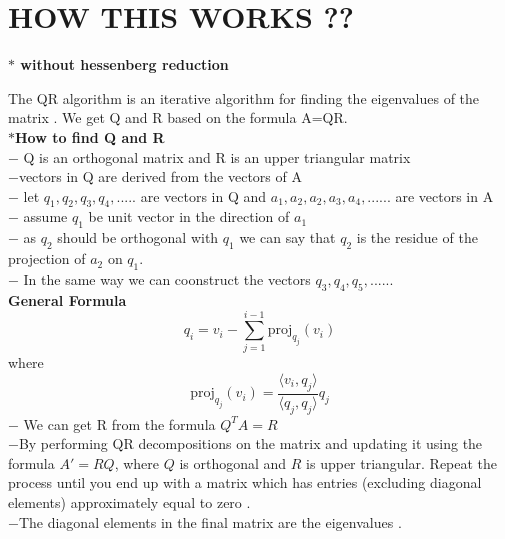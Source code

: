 \documentclass[journal]{IEEEtran}
\begin{document}
\section{\textbf{HOW THIS WORKS ??}}\vspace{0.3cm}
\begin{center}
     \textbf{$*$ without hessenberg reduction}
\end{center}
The QR algorithm is an iterative algorithm for finding the eigenvalues of the matrix . We get Q and R based on the formula A=QR.\vspace{0.3cm}\\
\textbf{$*$How to find Q and R}\vspace{0.3cm}\\
$-$ Q is an orthogonal matrix and R is an upper triangular matrix \vspace{0.3cm}\\
$-$vectors in Q are derived from the vectors of A \vspace{0.3cm}\\
$-$ let   $q_1,q_2,q_3,q_4,.....$   are vectors in Q and $a_1,a_2,a_2,a_3,a_4,......$  are vectors in A\vspace{0.3cm}\\
$-$ assume $q_1$ be unit vector in the direction of $a_1$\vspace{0.3cm}\\
$-$ as $q_2$ should be orthogonal with $q_1$ we can say that $q_2$ is the residue of the projection of $a_2$ on $q_1$.\vspace{0.3cm}\\
$-$ In the same way we can coonstruct the vectors $q_3,q_4,q_5,......$ \vspace{0.3cm}\\
\textbf{General Formula}\\
\[
q_i = v_i - \sum_{j=1}^{i-1} \text{proj}_{q_j}(v_i)
\]
where
\[
\text{proj}_{q_j}(v_i) = \frac{\langle v_i, q_j \rangle}{\langle q_j, q_j \rangle} q_j
\]
$-$ We can get R from the formula $Q^{T}A=R$\vspace{0.3cm}\\
$-$By performing QR decompositions on the matrix and updating it using the formula \( A' = RQ \), where \( Q \) is orthogonal and \( R \) is upper triangular. Repeat the process until you end up with a matrix which has entries (excluding diagonal elements) approximately equal to zero . \vspace{0.3cm}\\
$-$The diagonal elements in the final matrix are the eigenvalues .\vspace{0.3cm}\\
\end{document}
